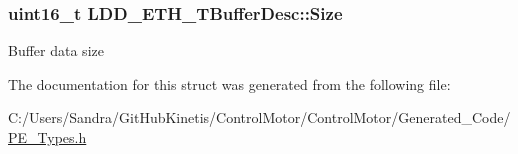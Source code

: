 \subsubsection[{\texorpdfstring{Size}{Size}}]{\setlength{\rightskip}{0pt plus 5cm}uint16\+\_\+t L\+D\+D\+\_\+\+E\+T\+H\+\_\+\+T\+Buffer\+Desc\+::\+Size}\hypertarget{struct_l_d_d___e_t_h___t_buffer_desc_abddc4273b732d3cf44ff0b6870d6b87a}{}\label{struct_l_d_d___e_t_h___t_buffer_desc_abddc4273b732d3cf44ff0b6870d6b87a}
Buffer data size 

The documentation for this struct was generated from the following file\+:\begin{DoxyCompactItemize}
\item 
C\+:/\+Users/\+Sandra/\+Git\+Hub\+Kinetis/\+Control\+Motor/\+Control\+Motor/\+Generated\+\_\+\+Code/\hyperlink{_p_e___types_8h}{P\+E\+\_\+\+Types.\+h}\end{DoxyCompactItemize}
